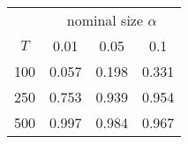 % 
\begin{tabular}{cccc}
  \hline
  & \multicolumn{3}{c}{nominal size $\alpha$} \\
 $T$ & 0.01 & 0.05 & 0.1 \\
 \hline
100 & 0.057 & 0.198 & 0.331 \\ 
  250 & 0.753 & 0.939 & 0.954 \\ 
  500 & 0.997 & 0.984 & 0.967 \\ 
   \hline
\end{tabular}
